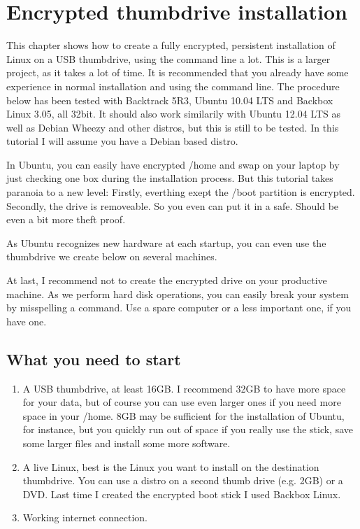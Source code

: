 \documentclass[12pt,a4paper]{article}
\begin{document}
\section{Encrypted thumbdrive installation}
This chapter shows how to create a fully encrypted, persistent installation of Linux on a USB thumbdrive, using the command line a lot. This is a larger project, as it takes a lot of time. It is recommended that you already have some experience in normal installation and using the command line. The procedure below has been tested with Backtrack 5R3, Ubuntu 10.04 LTS and Backbox Linux 3.05, all 32bit. It should also work similarily with Ubuntu 12.04 LTS as well as Debian Wheezy and other distros, but this is still to be tested. In this tutorial I will assume you have a Debian based distro.

In Ubuntu, you can easily have encrypted /home and swap on your laptop by just checking one box during the installation process. But this tutorial takes paranoia to a new level: Firstly, everthing exept the /boot partition is encrypted. Secondly, the drive is removeable. So you even can put it in a safe. Should be even a bit more theft proof.

As Ubuntu recognizes new hardware at each startup, you can even use the thumbdrive we create below on several machines.

At last, I recommend not to create the encrypted drive on your productive machine. As we perform hard disk operations, you can easily break your system by misspelling a command. Use a spare computer or a less important one, if you have one.

\subsection{What you need to start}
\begin{enumerate}
\item A USB thumbdrive, at least 16GB. I recommend 32GB to have more space for your data, but of course you can use even larger ones if you need more space in your /home. 8GB may be sufficient for the installation of Ubuntu, for instance, but you quickly run out of space if you really use the stick, save some larger files and install some more software.
\item A live Linux, best is the Linux you want to install on the destination thumbdrive. You can use a distro on a second thumb drive (e.g. 2GB) or a DVD. Last time I created the encrypted boot stick I used Backbox Linux.
\item Working internet connection.
\end{enumerate}
\end{document}
